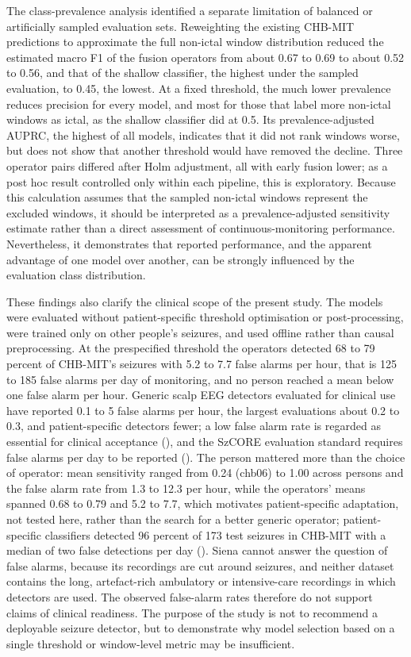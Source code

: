 \documentclass[11pt,a4paper]{article}
\begin{document}
The class-prevalence analysis identified a separate limitation of balanced or
artificially sampled evaluation sets. Reweighting the existing CHB-MIT predictions to
approximate the full non-ictal window distribution reduced the estimated macro F1 of the
fusion operators from about 0.67 to 0.69 to about 0.52 to 0.56, and that of the shallow
classifier, the highest under the sampled evaluation, to 0.45, the lowest. At a fixed
threshold, the much lower prevalence reduces precision for every model, and most for
those that label more non-ictal windows as ictal, as the shallow classifier did at 0.5.
Its prevalence-adjusted AUPRC, the highest of all models, indicates that it did not rank
windows worse, but does not show that another threshold would have removed the decline.
Three operator pairs differed after Holm adjustment, all with early fusion lower; as a
post hoc result controlled only within each pipeline, this is exploratory. Because this
calculation assumes that the sampled non-ictal windows represent the excluded windows, it
should be interpreted as a prevalence-adjusted sensitivity estimate rather than a direct
assessment of continuous-monitoring performance. Nevertheless, it demonstrates that
reported performance, and the apparent advantage of one model over another, can be
strongly influenced by the evaluation class distribution.

These findings also clarify the clinical scope of the present study. The models were
evaluated without patient-specific threshold optimisation or post-processing, were
trained only on other people's seizures, and used offline rather than causal
preprocessing. At the prespecified threshold the operators detected 68 to 79 percent of
CHB-MIT's seizures with 5.2 to 7.7 false alarms per hour, that is 125 to 185 false alarms
per day of monitoring, and no person reached a mean below one false alarm per hour.
Generic scalp EEG detectors evaluated for clinical use have reported 0.1 to 5 false alarms
per hour, the largest evaluations about 0.2 to 0.3, and patient-specific detectors fewer; a low false alarm
rate is regarded as essential for clinical acceptance (\citealp{Baumgartner_2018}), and the
SzCORE evaluation standard requires false alarms per day to be reported (\citealp{Dan_2025}). The person
mattered more than the choice of operator: mean sensitivity ranged from 0.24 (chb06) to
1.00 across persons and the false alarm rate from 1.3 to 12.3 per hour, while the
operators' means spanned 0.68 to 0.79 and 5.2 to 7.7, which motivates patient-specific adaptation, not tested here, rather than the search for a better generic operator; patient-specific classifiers
detected 96 percent of 173 test seizures in CHB-MIT with a median of two false detections per
day (\citealp{Shoeb_2010}). Siena cannot answer the question of false alarms, because
its recordings are cut around seizures, and neither dataset contains the long,
artefact-rich ambulatory or intensive-care recordings in which detectors are used. The
observed false-alarm rates therefore do not support claims of clinical readiness. The
purpose of the study is not to recommend a deployable seizure detector, but to
demonstrate why model selection based on a single threshold or window-level metric may
be insufficient.
\end{document}
